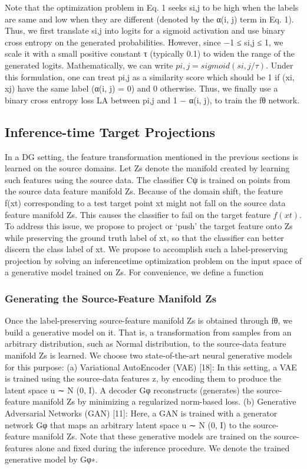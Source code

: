 \documentclass[review]{cvpr}
\begin{document}
Note that the optimization problem in Eq. 1 seeks si,j to
be high when the labels are same and low when they are
different (denoted by the α(i, j) term in Eq. 1). Thus,
we first translate si,j into logits for a sigmoid activation
and use binary cross entropy on the generated probabilities. However, since −1 ≤ si,j ≤ 1, we scale it with
a small positive constant τ (typically 0.1) to widen the
range of the generated logits. Mathematically, we can write
$pi,j = sigmoid(si,j/τ).$ Under this formulation, one can
treat pi,j as a similarity score which should be 1 if (xi, xj)
have the same label (α(i, j) = 0) and 0 otherwise. Thus,
we finally use a binary cross entropy loss LA between pi,j
and 1 − α(i, j), to train the fθ network.

\subsection{Inference-time Target Projections}

In a DG setting, the feature transformation mentioned
in the previous sections is learned on the source domains.
Let Zs denote the manifold created by learning such features using the source data. The classifier Cψ is trained on
points from the source data feature manifold Zs. Because
of the domain shift, the feature f(xt) corresponding to a
test target point xt might not fall on the source data feature manifold Zs. This causes the classifier to fail on the
target feature $f(xt)$. To address this issue, we propose to
project or ‘push’ the target feature onto Zs while preserving
the ground truth label of xt, so that the classifier can better
discern the class label of xt. We propose to accomplish
such a label-preserving projection by solving an inferencetime optimization problem on the input space of a generative model trained on Zs. For convenience, we define a
function


\subsubsection{Generating the Source-Feature Manifold Zs}
Once the label-preserving source-feature manifold Zs is obtained through fθ, we build a generative model on it. That
is, a transformation from samples from an arbitrary distribution, such as Normal distribution, to the source-data feature
manifold Zs is learned. We choose two state-of-the-art neural generative models for this purpose: (a) Variational AutoEncoder (VAE) [18]: In this setting, a VAE is trained using the source-data features z, by encoding them to produce
the latent space u ∼ N (0, I). A decoder Gφ reconstructs
(generates) the source-feature manifold Zs by minimizing
a regularized norm-based loss. (b) Generative Adversarial Networks (GAN) [11]: Here, a GAN is trained with a
generator network Gφ that maps an arbitrary latent space u ∼ N (0, I) to the source-feature manifold Zs. Note that
these generative models are trained on the source-features
alone and fixed during the inference procedure. We denote
the trained generative model by Gφ∗.
\end{document}
